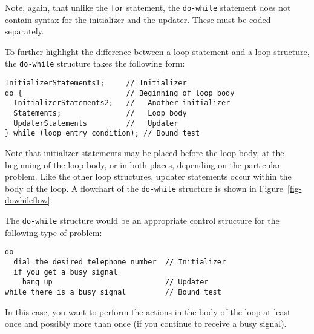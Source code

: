 \noindent Note, again, that unlike the {\tt for} statement, the {\tt do-while}
statement does not contain syntax for the initializer and the updater.
These must be coded separately.

To further highlight the difference between a loop statement and a
loop structure, the {\tt do-while} structure takes the following
form:

\begin{jjjlisting}
\begin{lstlisting}
InitializerStatements1;     // Initializer
do {                        // Beginning of loop body
  InitializerStatements2;   //   Another initializer
  Statements;               //   Loop body
  UpdaterStatements         //   Updater
} while (loop entry condition); // Bound test
\end{lstlisting}
\end{jjjlisting}

\noindent Note that initializer statements may be placed
before the loop body, at the beginning of the loop body, or in
both places, depending on the particular problem. Like the other loop
structures, updater statements occur within the body of the loop.  A
flowchart of the {\tt do-while} structure is shown in
Figure~\ref{fig-dowhileflow}.

\begin{figure}[t]
\end{figure}

The {\tt do-while} structure would be an appropriate control structure
for the following type of problem:

\begin{jjjlisting}
\begin{lstlisting}[stringstyle=\color{black}]
do
  dial the desired telephone number  // Initializer
  if you get a busy signal
    hang up                          // Updater
while there is a busy signal         // Bound test
\end{lstlisting}
\end{jjjlisting}

\noindent In this case, you want to perform the actions in
the body of the loop at least once and possibly more than
once (if you continue to receive a busy signal).


